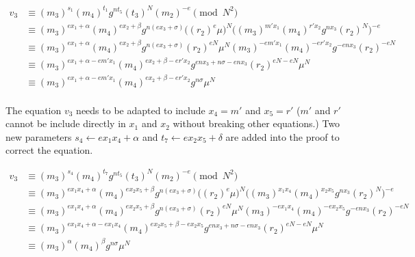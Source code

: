 \begin{equation}
\begin{split}
   v_3 &\equiv (m_3)^{s_1} (m_4)^{t_1} g^{nt_5} (t_3)^{N} (m_2)^{-e} \pmod{N^2} \\
       &\equiv (m_3)^{ex_1 + \alpha} (m_4)^{ex_2 + \beta} g^{n(ex_3 + \sigma)}
       \big((r_2)^e \mu\big)^{N}
       \big((m_3)^{m' x_1} (m_4)^{r' x_2} g^{nx_3} (r_2)^{N}\big)^{-e} \\
       &\equiv (m_3)^{ex_1 + \alpha} (m_4)^{ex_2 + \beta} g^{n(ex_3 + \sigma)}
       (r_2)^{eN} \mu^{N}
       (m_3)^{-e m' x_1} (m_4)^{-e r' x_2} g^{-e nx_3} (r_2)^{-eN} \\
       &\equiv (m_3)^{ex_1 + \alpha - e m' x_1} (m_4)^{ex_2 + \beta - e r' x_2}
       g^{enx_3 + n\sigma - enx_3} (r_2)^{eN - eN} \mu^{N}  \\
       &\equiv (m_3)^{ex_1 + \alpha - e m' x_1} (m_4)^{ex_2 + \beta - e r' x_2}
       g^{n\sigma} \mu^{N}  \\
\end{split}
\end{equation}

The equation $v_3$ needs to be adapted to include $x_4 = m'$ and $x_5 = r'$ ($m'$
and $r'$ cannot be include directly in $x_1$ and $x_2$ without breaking other
equations.) Two new parameters $s_4 \leftarrow ex_1 x_4 + \alpha$ and
$t_7 \leftarrow ex_2 x_5 + \delta$ are added into the proof to correct
the equation.

\begin{equation}
\begin{split}
   v_3 &\equiv (m_3)^{s_4} (m_4)^{t_7} g^{nt_5} (t_3)^{N} (m_2)^{-e} \pmod{N^2} \\
       &\equiv (m_3)^{ex_1x_4 + \alpha} (m_4)^{ex_2x_5 + \beta} g^{n(ex_3 + \sigma)}
       \big((r_2)^e \mu\big)^{N}
       \big((m_3)^{x_1x_4} (m_4)^{x_2x_5} g^{nx_3} (r_2)^{N}\big)^{-e} \\
       &\equiv (m_3)^{ex_1x_4 + \alpha} (m_4)^{ex_2x_5 + \beta} g^{n(ex_3 + \sigma)}
       (r_2)^{eN} \mu^{N}
       (m_3)^{-e x_1x_4} (m_4)^{-e x_2x_5} g^{-e nx_3} (r_2)^{-eN} \\
       &\equiv (m_3)^{ex_1x_4 + \alpha - e x_1x_4} (m_4)^{ex_2x_5 + \beta - e x_2x_5}
       g^{enx_3 + n\sigma - enx_3} (r_2)^{eN - eN} \mu^{N}  \\
       &\equiv (m_3)^{\alpha} (m_4)^{\beta} g^{n\sigma} \mu^{N} \\
\end{split}
\end{equation}


